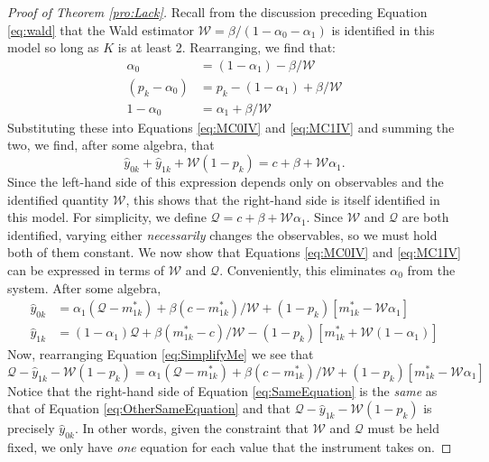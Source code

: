 \begin{proof}[Proof of Theorem \ref{pro:Lack}]

  Recall from the discussion preceding Equation \ref{eq:wald} that the Wald estimator $\mathcal{W} = \beta/(1-\alpha_0-\alpha_1)$ is identified in this model so long as $K$ is at least 2. 
  Rearranging, we find that:
  \begin{align*}
    \alpha_0 &= (1-\alpha_1) - \beta/\mathcal{W} \\
    (p_k - \alpha_0) &= p_k - (1-\alpha_1) + \beta/\mathcal{W}\\
    1 - \alpha_0 &= \alpha_1 + \beta/\mathcal{W}
  \end{align*}
Substituting these into Equations \ref{eq:MC0IV} and \ref{eq:MC1IV} and summing the two, we find, after some algebra, that
\[\hat{y}_{0k} + \hat{y}_{1k} + \mathcal{W}(1-p_k) = c + \beta + \mathcal{W} \alpha_1.\]
Since the left-hand side of this expression depends only on observables and the identified quantity $\mathcal{W}$, this shows that the right-hand side is itself identified in this model.
For simplicity, we define $\mathcal{Q} = c + \beta + \mathcal{W}\alpha_1$.
Since $\mathcal{W}$ and $\mathcal{Q}$ are both identified, varying either \emph{necessarily} changes the observables, so we must hold both of them constant. 
We now show that Equations \ref{eq:MC0IV} and \ref{eq:MC1IV} can be expressed in terms of $\mathcal{W}$ and $\mathcal{Q}$.
Conveniently, this eliminates $\alpha_0$ from the system.
After some algebra, 
\begin{align}
  \label{eq:OtherSameEquation}
  \hat{y}_{0k} &= \alpha_1 (\mathcal{Q} - m^*_{1k}) + \beta(c-m^*_{1k})/\mathcal{W} + (1-p_k)\left[m^*_{1k} - \mathcal{W}\alpha_1\right]\\
  \hat{y}_{1k} &= (1-\alpha_1) \mathcal{Q} + \beta(m^*_{1k} - c)/\mathcal{W} - (1-p_k)\left[m^*_{1k} + \mathcal{W}(1-\alpha_1)\right]
  \label{eq:SimplifyMe}
\end{align}
Now, rearranging Equation \ref{eq:SimplifyMe} we see that
\begin{equation}
  \mathcal{Q} - \hat{y}_{1k} - \mathcal{W}(1-p_k) = \alpha_1 (\mathcal{Q} - m^*_{1k}) + \beta(c-m^*_{1k})/\mathcal{W} + (1-p_k)\left[m^*_{1k} - \mathcal{W}\alpha_1\right]
  \label{eq:SameEquation}
\end{equation}
Notice that the right-hand side of Equation \ref{eq:SameEquation} is the \emph{same} as that of Equation \ref{eq:OtherSameEquation} and that $\mathcal{Q} - \hat{y}_{1k} - \mathcal{W}(1-p_k)$ is precisely $\hat{y}_{0k}$.
In other words, given the constraint that $\mathcal{W}$ and $\mathcal{Q}$ must be held fixed, we only have \emph{one} equation for each value that the instrument takes on.

\end{proof}
